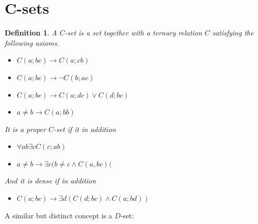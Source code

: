 \documentclass{amsart}
\newtheorem{definition}[theorem]{Definition}
\begin{document}
\section{C-sets}\label{C sets}



\begin{definition}

A $C$-set is a set together with a ternary relation $C$ satisfying the following axioms.

\begin{itemize}
    \item[(C1)] $C(a; bc) \rightarrow C(a; cb)$
    \item[(C2)] $C(a; bc) \rightarrow \lnot C(b; ac)$
    \item[(C3)] $C(a; bc) \rightarrow C(a; dc) \vee C(d;bc)$
    \item[(C4)] $a \neq b \rightarrow C(a; bb)$
\end{itemize}

It is a \emph{proper} $C$-set if it in addition

\begin{itemize}
    \item[(C5)]  $\forall ab \exists c C(c; ab)$
    \item[(C5$^*$)]  $ a \neq b \rightarrow \exists c (b\neq c \wedge C(a, bc)($
\end{itemize}

And it is dense if in addition

\begin{itemize}
    \item[(C6)]  $C(a;bc) \rightarrow \exists d (C(d;bc) \wedge C(a;bd)) $
\end{itemize}
\end{definition}


A similar but distinct concept is a $D$-set:
\end{document}
